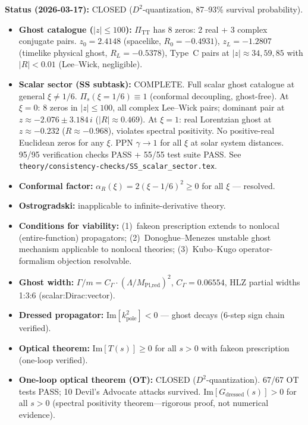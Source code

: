 \documentclass[12pt,a4paper]{article}
\begin{document}
\textbf{Status (2026-03-17):} \textcolor{proven}{CLOSED ($D^2$-quantization, 87--93\% survival probability).}
\begin{itemize}
  \item \textbf{Ghost catalogue ($|z| \leq 100$):} $\Pi_{\text{TT}}$ has 8 zeros:
    2 real + 3 complex conjugate pairs.
    $z_0 = 2.4148$ (spacelike, $R_0 = -0.4931$),
    $z_L = -1.2807$ (timelike physical ghost, $R_L = -0.5378$),
    Type~C pairs at $|z| \approx 34, 59, 85$ with $|R| < 0.01$ (Lee--Wick, negligible).
  \item \textbf{Scalar sector (SS subtask):} \textcolor{proven}{COMPLETE.}
    Full scalar ghost catalogue at general $\xi \neq 1/6$.
    $\Pi_s(\xi=1/6) \equiv 1$ (conformal decoupling, ghost-free).
    At $\xi = 0$: 8 zeros in $|z| \leq 100$, all complex Lee--Wick pairs;
    dominant pair at $z \approx -2.076 \pm 3.184\,i$ ($|R| \approx 0.469$).
    At $\xi = 1$: real Lorentzian ghost at $z \approx -0.232$ ($R \approx -0.968$),
    violates spectral positivity.
    No positive-real Euclidean zeros for any $\xi$.
    PPN $\gamma \to 1$ for all $\xi$ at solar system distances.
    95/95 verification checks PASS + 55/55 test suite PASS.
    See \texttt{theory/consistency-checks/SS\_scalar\_sector.tex}.
  \item \textbf{Conformal factor:} $\alpha_R(\xi) = 2(\xi-1/6)^2 \geq 0$ for all $\xi$ --- resolved.
  \item \textbf{Ostrogradski:} inapplicable to infinite-derivative theory.
  \item \textbf{Conditions for viability:} (1)~fakeon prescription extends to nonlocal (entire-function) propagators;
    (2)~Donoghue--Menezes unstable ghost mechanism applicable to nonlocal theories;
    (3)~Kubo--Kugo operator-formalism objection resolvable.
  \item \textbf{Ghost width:} $\Gamma/m = C_\Gamma \cdot (\Lambda/M_{\text{Pl,red}})^2$,
    $C_\Gamma = 0.06554$, HLZ partial widths 1:3:6 (scalar:Dirac:vector).
  \item \textbf{Dressed propagator:} $\text{Im}[k^2_{\text{pole}}] < 0$ --- ghost decays (6-step sign chain verified).
  \item \textbf{Optical theorem:} $\text{Im}[T(s)] \geq 0$ for all $s > 0$ with fakeon prescription (one-loop verified).
  \item \textbf{One-loop optical theorem (OT):} \textcolor{proven}{CLOSED ($D^2$-quantization).}
    67/67 OT tests PASS; 10 Devil's Advocate attacks survived.
    $\text{Im}[G_{\text{dressed}}(s)] > 0$ for all $s > 0$ (spectral positivity theorem---rigorous proof, not numerical evidence).

\end{itemize}
\end{document}
